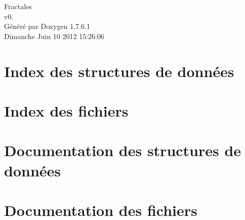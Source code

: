 \documentclass[a4paper]{book}
\begin{document}
\hypersetup{pageanchor=false,citecolor=blue}
\begin{titlepage}
\vspace*{7cm}
\begin{center}
{\Large \-Fractales \\[1ex]\large v0. }\\
\vspace*{1cm}
{\large \-Généré par Doxygen 1.7.6.1}\\
\vspace*{0.5cm}
{\small Dimanche Juin 10 2012 15:26:06}\\
\end{center}
\end{titlepage}
\clearemptydoublepage
{}
\tableofcontents
\clearemptydoublepage
{}
\hypersetup{pageanchor=true,citecolor=blue}
\chapter{\-Index des structures de données}

\chapter{\-Index des fichiers}

\chapter{\-Documentation des structures de données}



\chapter{\-Documentation des fichiers}















\printindex
\end{document}
